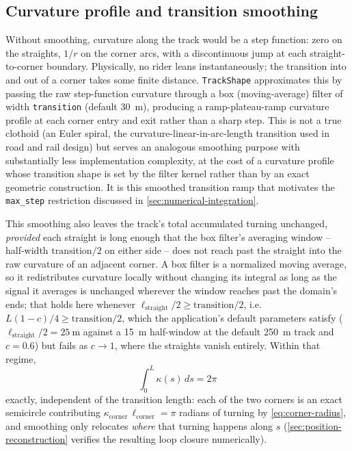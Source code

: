 \subsection{Curvature profile and transition smoothing}
\label{sec:curvature-smoothing}

Without smoothing, curvature along the track would be a step function: zero on
the straights, $1/r$ on the corner arcs, with a discontinuous jump at each
straight-to-corner boundary. Physically, no rider leans instantaneously; the
transition into and out of a corner takes some finite distance. \nolinkurl{TrackShape}
approximates this by passing the raw step-function curvature through a
box (moving-average) filter of width \nolinkurl{transition} (default
\SI{30}{\metre}), producing a ramp-plateau-ramp curvature profile at each corner
entry and exit rather than a sharp step. This is not a true clothoid (an Euler
spiral, the curvature-linear-in-arc-length transition used in road and rail
design) but serves an analogous smoothing purpose with substantially less
implementation complexity, at the cost of a curvature profile whose transition
shape is set by the filter kernel rather than by an exact geometric construction.
It is this smoothed transition ramp that motivates the \nolinkurl{max_step}
restriction discussed in \cref{sec:numerical-integration}.

This smoothing also leaves the track's total accumulated turning unchanged,
\emph{provided} each straight is long enough that the box filter's averaging
window -- half-width $\mathrm{transition}/2$ on either side -- does not reach
past the straight into the raw curvature of an adjacent corner. A box filter is
a normalized moving average, so it redistributes curvature locally without
changing its integral as long as the signal it averages is unchanged wherever
the window reaches past the domain's ends; that holds here whenever
$\ell_{\mathrm{straight}}/2 \geq \mathrm{transition}/2$, i.e.
$L(1-c)/4 \geq \mathrm{transition}/2$, which the application's default
parameters satisfy ($\ell_{\mathrm{straight}}/2 = \SI{25}{\metre}$ against a
\SI{15}{\metre} half-window at the default \SI{250}{\metre} track and $c=0.6$)
but fails as $c \to 1$, where the straights vanish entirely. Within that regime,
\begin{equation}
    \int_0^L \kappa(s)\,ds = 2\pi
    \label{eq:total-turning}
\end{equation}
exactly, independent of the transition length: each of the two corners is an
exact semicircle contributing $\kappa_{\mathrm{corner}}\,\ell_{\mathrm{corner}}
= \pi$ radians of turning by \cref{eq:corner-radius}, and smoothing only
relocates \emph{where} that turning happens along $s$
(\cref{sec:position-reconstruction} verifies the resulting loop closure
numerically).

